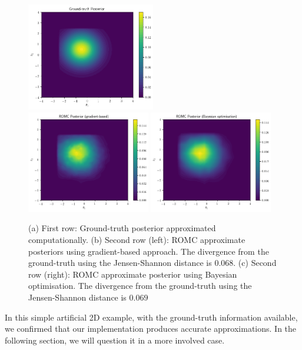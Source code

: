 \begin{figure}[h]
  \begin{center}
      \includegraphics[width=0.5\textwidth]{./Thesis/images/chapter4/ex2D_gt_posterior.png}\\
      \includegraphics[width=0.48\textwidth]{./Thesis/images/chapter4/ex2D_romc_posterior.png}
      \includegraphics[width=0.48\textwidth]{./Thesis/images/chapter4/ex2D_romc_posterior_bo.png}
    \end{center}
    \caption{(a) First row: Ground-truth posterior approximated
      computationally. (b) Second row (left): ROMC approximate
      posteriors using gradient-based approach. The divergence from
      the ground-truth using the Jensen-Shannon distance is
      $0.068$. (c) Second row (right): ROMC approximate posterior
      using Bayesian optimisation. The divergence from the
      ground-truth using the Jensen-Shannon distance is $0.069$}
  \label{fig:ex2_4}
\end{figure}

In this simple artificial 2D example, with the ground-truth
information available, we confirmed that our implementation produces
accurate approximations. In the following section, we will question it
in a more involved case.

